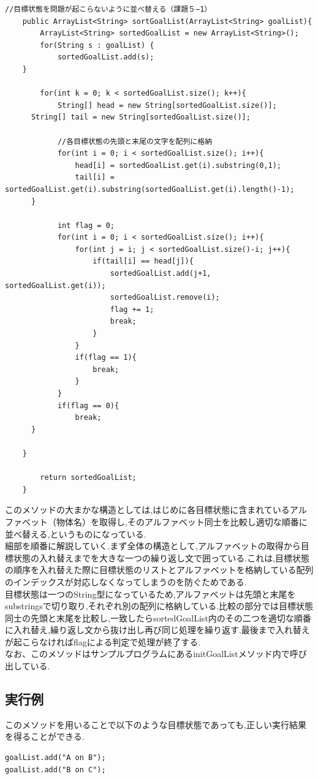 \documentclass[uplatex,12pt]{jsarticle}
\begin{document}
\begin{lstlisting}[caption=sortGoalListメソッド, label=mid]
//目標状態を問題が起こらないように並べ替える（課題５−1）
	public ArrayList<String> sortGoalList(ArrayList<String> goalList){
		ArrayList<String> sortedGoalList = new ArrayList<String>();
		for(String s : goalList) {
			sortedGoalList.add(s);
    }
    
		for(int k = 0; k < sortedGoalList.size(); k++){
			String[] head = new String[sortedGoalList.size()];
      String[] tail = new String[sortedGoalList.size()];
      
			//各目標状態の先頭と末尾の文字を配列に格納
			for(int i = 0; i < sortedGoalList.size(); i++){
				head[i] = sortedGoalList.get(i).substring(0,1);
				tail[i] = sortedGoalList.get(i).substring(sortedGoalList.get(i).length()-1);
      }
      
			int flag = 0;
			for(int i = 0; i < sortedGoalList.size(); i++){
				for(int j = i; j < sortedGoalList.size()-i; j++){
					if(tail[i] == head[j]){
						sortedGoalList.add(j+1, sortedGoalList.get(i));
						sortedGoalList.remove(i);
						flag += 1;
						break;
					}
				}
				if(flag == 1){
					break;
				}			
			}
			if(flag == 0){
				break;
      }
      
    }
    
		return sortedGoalList;
	}
\end{lstlisting}
このメソッドの大まかな構造としては,はじめに各目標状態に含まれているアルファベット（物体名）を取得し,そのアルファベット同士を比較し適切な順番に並べ替える,というものになっている.\\
細部を順番に解説していく.まず全体の構造として,アルファベットの取得から目標状態の入れ替えまでを大きな一つの繰り返し文で囲っている.これは,目標状態の順序を入れ替えた際に目標状態のリストとアルファベットを格納している配列のインデックスが対応しなくなってしまうのを防ぐためである.\\
目標状態は一つのString型になっているため,アルファベットは先頭と末尾をsubstringsで切り取り,それぞれ別の配列に格納している.比較の部分では目標状態同士の先頭と末尾を比較し,一致したらsortedGoalList内のその二つを適切な順番に入れ替え,繰り返し文から抜け出し再び同じ処理を繰り返す.最後まで入れ替えが起こらなければflagによる判定で処理が終了する.\\
なお、このメソッドはサンプルプログラムにあるinitGoalListメソッド内で呼び出している.

\subsection{実行例}
このメソッドを用いることで以下のような目標状態であっても,正しい実行結果を得ることができる.
\begin{lstlisting}[caption=目標状態, label=mid]
goalList.add("A on B");
goalList.add("B on C");
\end{lstlisting}
\end{document}
